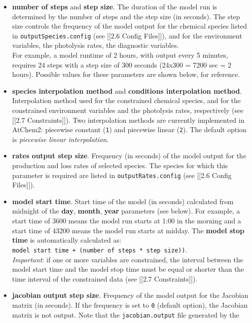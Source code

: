 \begin{itemize}
\item \textbf{number of steps} and \textbf{step size}. The duration of
the model run is determined by the number of steps and the step size
(in seconds). The step size controls the frequency of the model output
for the chemical species listed in \texttt{outputSpecies.config} (see
{[}{[}2.6 Config Files{]}{]}), and for the environment variables, the
photolysis rates, the diagnostic variables.\\ For example, a model
runtime of 2 hours, with output every 5 minutes, requires 24 steps
with a step size of 300 seconds (24x300 = 7200 sec = 2
hours). Possible values for these parameters are shown below, for
reference.
\item \textbf{species interpolation method} and \textbf{conditions
interpolation method}. Interpolation method used for the constrained
chemical species, and for the constrained environment variables and
the photolysis rates, respectively (see {[}{[}2.7 Constraints{]}{]}).
Two interpolation methods are currently implemented in AtChem2:
piecewise constant (\texttt{1}) and piecewise linear (\texttt{2}). The
default option is \emph{piecewise linear interpolation}.
\item \textbf{rates output step size}. Frequency (in seconds) of the
model output for the production and loss rates of selected
species. The species for which this parameter is required are listed
in \texttt{outputRates.config} (see {[}{[}2.6 Config Files{]}{]}).
\item \textbf{model start time}. Start time of the model (in seconds)
calculated from midnight of the \textbf{day}, \textbf{month},
\textbf{year} parameters (see below). For example, a start time of
3600 means the model run starts at 1:00 in the morning and a start
time of 43200 means the model run starts at midday. The \textbf{model
stop time} is automatically calculated as: \texttt{model\ start\ time\
+\ (number\ of\ steps\ *\ step\ size))}.\\ \emph{Important}: if one or
more variables are constrained, the interval between the model start
time and the model stop time must be equal or shorter than the time
interval of the constrained data (see {[}{[}2.7 Constraints{]}{]}).
\item \textbf{jacobian output step size}. Frequency of the model
output for the Jacobian matrix (in seconds). If the frequency is set
to \texttt{0} (default option), the Jacobian matrix is not
output. Note that the \texttt{jacobian.output} file generated by the

\end{itemize}
